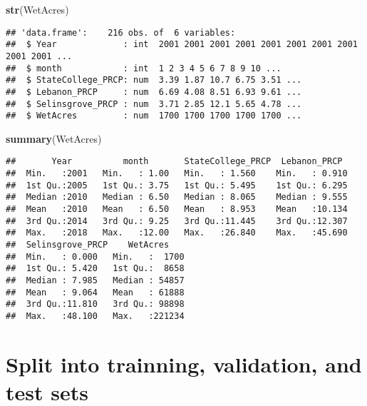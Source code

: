 \documentclass[]{article}
\newenvironment{Shaded}{\begin{snugshade}}{\end{snugshade}}
\newcommand{\KeywordTok}[1]{\textcolor[rgb]{0.13,0.29,0.53}{\textbf{{#1}}}}
\newcommand{\NormalTok}[1]{{#1}}
\begin{document}
\begin{Shaded}
\begin{Highlighting}[]
\KeywordTok{str}\NormalTok{(WetAcres)}
\end{Highlighting}
\end{Shaded}

\begin{verbatim}
## 'data.frame':    216 obs. of  6 variables:
##  $ Year             : int  2001 2001 2001 2001 2001 2001 2001 2001 2001 2001 ...
##  $ month            : int  1 2 3 4 5 6 7 8 9 10 ...
##  $ StateCollege_PRCP: num  3.39 1.87 10.7 6.75 3.51 ...
##  $ Lebanon_PRCP     : num  6.69 4.08 8.51 6.93 9.61 ...
##  $ Selinsgrove_PRCP : num  3.71 2.85 12.1 5.65 4.78 ...
##  $ WetAcres         : num  1700 1700 1700 1700 1700 ...
\end{verbatim}

\begin{Shaded}
\begin{Highlighting}[]
\KeywordTok{summary}\NormalTok{(WetAcres)}
\end{Highlighting}
\end{Shaded}

\begin{verbatim}
##       Year          month       StateCollege_PRCP  Lebanon_PRCP   
##  Min.   :2001   Min.   : 1.00   Min.   : 1.560    Min.   : 0.910  
##  1st Qu.:2005   1st Qu.: 3.75   1st Qu.: 5.495    1st Qu.: 6.295  
##  Median :2010   Median : 6.50   Median : 8.065    Median : 9.555  
##  Mean   :2010   Mean   : 6.50   Mean   : 8.953    Mean   :10.134  
##  3rd Qu.:2014   3rd Qu.: 9.25   3rd Qu.:11.445    3rd Qu.:12.307  
##  Max.   :2018   Max.   :12.00   Max.   :26.840    Max.   :45.690  
##  Selinsgrove_PRCP    WetAcres     
##  Min.   : 0.000   Min.   :  1700  
##  1st Qu.: 5.420   1st Qu.:  8658  
##  Median : 7.985   Median : 54857  
##  Mean   : 9.064   Mean   : 61888  
##  3rd Qu.:11.810   3rd Qu.: 98898  
##  Max.   :48.100   Max.   :221234
\end{verbatim}

\section{Split into trainning, validation, and test
sets}\label{split-into-trainning-validation-and-test-sets}
\end{document}
